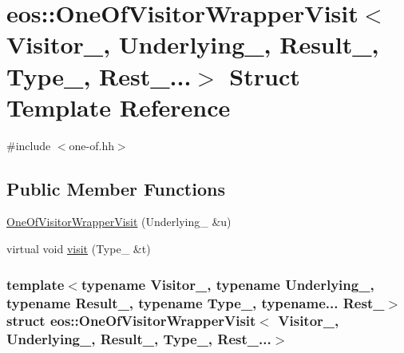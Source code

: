 \hypertarget{structeos_1_1OneOfVisitorWrapperVisit_3_01Visitor___00_01Underlying___00_01Result___00_01Type___00_01Rest___8_8_8_4}{
\section{eos::OneOfVisitorWrapperVisit$<$ Visitor\_\-, Underlying\_\-, Result\_\-, Type\_\-, Rest\_\-...$>$ Struct Template Reference}
\label{structeos_1_1OneOfVisitorWrapperVisit_3_01Visitor___00_01Underlying___00_01Result___00_01Type___00_01Rest___8_8_8_4}
}


{\ttfamily \#include $<$one-\/of.hh$>$}\subsection*{Public Member Functions}
\begin{DoxyCompactItemize}
\item 
\hyperlink{structeos_1_1OneOfVisitorWrapperVisit_3_01Visitor___00_01Underlying___00_01Result___00_01Type___00_01Rest___8_8_8_4_a6dcaea16ba357d802503c53cf87f23c7}{OneOfVisitorWrapperVisit} (Underlying\_\- \&u)
\item 
virtual void \hyperlink{structeos_1_1OneOfVisitorWrapperVisit_3_01Visitor___00_01Underlying___00_01Result___00_01Type___00_01Rest___8_8_8_4_a863282de1b7dca811be133475d78b6ef}{visit} (Type\_\- \&t)
\end{DoxyCompactItemize}
\subsubsection*{template$<$typename Visitor\_\-, typename Underlying\_\-, typename Result\_\-, typename Type\_\-, typename... Rest\_\-$>$ struct eos::OneOfVisitorWrapperVisit$<$ Visitor\_\-, Underlying\_\-, Result\_\-, Type\_\-, Rest\_\-...$>$}



